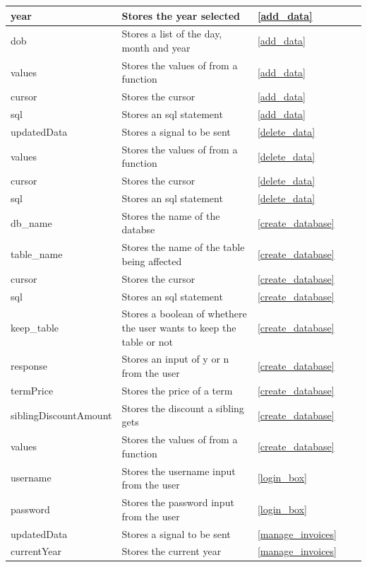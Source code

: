 \begin{center}
\begin{longtable}{|p{2cm}|p{2cm}|p{2cm}|p{2cm}|l}
		year & Stores the year selected & \ref{add_data} & \\ \hline
		dob & Stores a list of the day, month and year & \ref{add_data} & \\ \hline
		values & Stores the values of from a function & \ref{add_data} & \\ \hline
		cursor & Stores the cursor & \ref{add_data} & \\ \hline
		sql & Stores an sql statement & \ref{add_data} & \\ \hline
		updatedData & Stores a signal to be sent & \ref{delete_data} & \\ \hline
		values & Stores the values of from a function & \ref{delete_data} & \\ \hline
		cursor & Stores the cursor & \ref{delete_data} & \\ \hline
		sql & Stores an sql statement & \ref{delete_data} & \\ \hline
		db\_name & Stores the name of the databse & \ref{create_database} & \\ \hline
		table\_name & Stores the name of the table being affected & \ref{create_database} & \\ \hline
		cursor & Stores the cursor & \ref{create_database} & \\ \hline
		sql & Stores an sql statement & \ref{create_database} & \\ \hline
		keep\_table & Stores a boolean of whethere the user wants to keep the table or not & \ref{create_database} & \\ \hline
		response & Stores an input of y or n from the user & \ref{create_database} & \\ \hline
		termPrice & Stores the price of a term & \ref{create_database} & \\ \hline
		siblingDiscountAmount & Stores the discount a sibling gets & \ref{create_database} & \\ \hline
		values & Stores the values of from a function & \ref{create_database} & \\ \hline
		username & Stores the username input from the user & \ref{login_box} & \\ \hline
		password & Stores the password input from the user &  \ref{login_box} & \\ \hline
		updatedData & Stores a signal to be sent & \ref{manage_invoices} & \\ \hline
		currentYear & Stores the current year & \ref{manage_invoices} & \\ \hline

\end{longtable}
\end{center}
